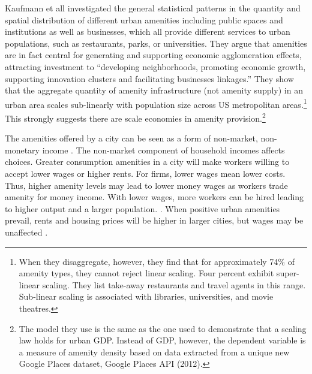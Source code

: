 Kaufmann et all \cite{kaufmannScalingUrbanAmenities2022} investigated the general statistical patterns in the quantity and spatial distribution of different urban amenities including public spaces and institutions as well as businesses, which all provide different services to urban populations, such as restaurants, parks, or universities.  They argue that amenities are   in fact central for generating and supporting economic agglomeration effects, attracting investment to ``developing neighborhoods, promoting economic growth, supporting innovation clusters and facilitating businesses linkages.'' 
They show that the aggregate quantity of amenity infrastructure (not amenity supply)  in an urban area scales sub-linearly with population size across US metropolitan areas.\footnote{When they disaggregate, however, they find that for approximately 74\% of amenity types, they cannot reject linear scaling. Four percent exhibit super-linear scaling. They list take-away restaurants and travel agents in this range. Sub-linear scaling is associated with libraries, universities, and movie theatres.} This strongly suggests there are scale economies in amenity provision.\footnote{The model they use is the same as the one used to demonstrate that a scaling law holds for urban GDP. Instead of GDP, however, the dependent variable is a measure of amenity density based on data extracted from a unique new Google Places dataset, Google Places API (2012).} 


The amenities offered by a city can be seen as a form of non-market, non-monetary income \cite{kaufmannScalingUrbanAmenities2022}.  The non-market component of household incomes affects choices. Greater consumption amenities in a city will make workers willing to accept lower wages or higher rents. For firms,  lower wages mean lower costs. Thus,  higher amenity levels may lead to lower money wages as workers trade amenity for money income. With lower wages, more workers can be hired leading to higher output and a larger population. \cite{pugaMagnitudeCausesAgglomeration2010}. 
When positive urban amenities prevail, rents and housing prices will be higher in larger cities, but wages may be unaffected \cite{robackWagesRentsAmenities1988, dalmazzoAmenitiesSkillbiasedAgglomeration2011}.




